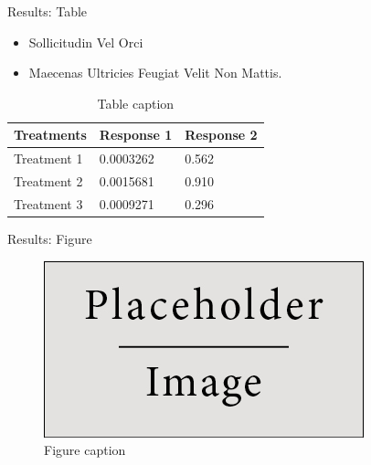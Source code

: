 \documentclass[final,hyperref={pdfpagelabels=false}]{beamer}
\begin{document}
\begin{frame}[t]
\begin{columns}[t]
\begin{column}{.465\textwidth}
\begin{block}{Results: Table}
\begin{itemize}
\item Sollicitudin Vel Orci
\item Maecenas Ultricies Feugiat Velit Non Mattis.
\end{itemize}

\begin{table}
\begin{tabular}{l l l}
\toprule
\textbf{Treatments} & \textbf{Response 1} & \textbf{Response 2}\\
\midrule
Treatment 1 & 0.0003262 & 0.562 \\
Treatment 2 & 0.0015681 & 0.910 \\
Treatment 3 & 0.0009271 & 0.296 \\
\bottomrule
\end{tabular}
\caption{Table caption}
\end{table}
     
\end{block}


\begin{block}{Results: Figure}






\begin{figure}
\includegraphics[width=0.8\linewidth]{placeholder.jpg}
\caption{Figure caption}
\end{figure}

\end{block}



\end{column}
\end{columns}
\end{frame}
\end{document}
